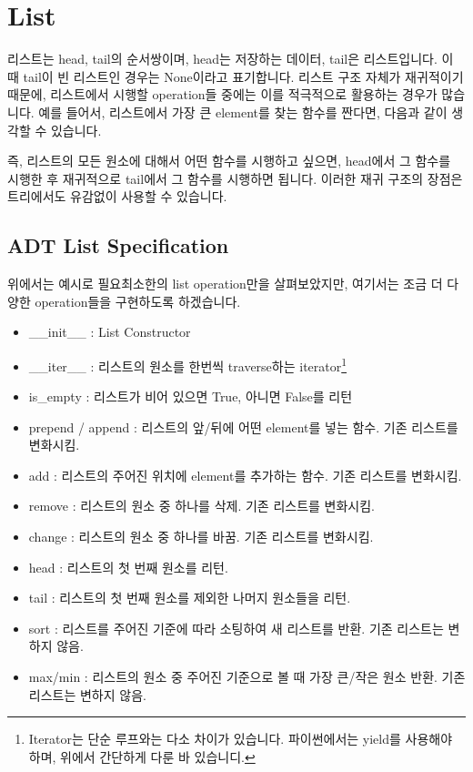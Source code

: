 \documentclass[titlepage]{report}
\begin{document}
\section{List} 

리스트는 head, tail의 순서쌍이며, head는 저장하는 데이터, tail은 리스트입니다. 이 때 tail이 빈 리스트인 경우는 None이라고 표기합니다. 리스트 구조 자체가 재귀적이기 때문에, 리스트에서 시행할 operation들 중에는 이를 적극적으로 활용하는 경우가 많습니다. 예를 들어서, 리스트에서 가장 큰 element를 찾는 함수를 짠다면, 다음과 같이 생각할 수 있습니다. 

 
                
즉, 리스트의 모든 원소에 대해서 어떤 함수를 시행하고 싶으면, head에서 그 함수를 시행한 후 재귀적으로 tail에서 그 함수를 시행하면 됩니다. 이러한 재귀 구조의 장점은 트리에서도 유감없이 사용할 수 있습니다. 

\subsection{ADT List Specification} 

위에서는 예시로 필요최소한의 list operation만을 살펴보았지만, 여기서는 조금 더 다양한 operation들을 구현하도록 하겠습니다. 

\begin{itemize} 
\item \_\_init\_\_ : List Constructor
\item \_\_iter\_\_ : 리스트의 원소를 한번씩 traverse하는 iterator\footnote{Iterator는 단순 루프와는 다소 차이가 있습니다. 파이썬에서는 yield를 사용해야 하며, 위에서 간단하게 다룬 바 있습니디.}
\item is\_empty : 리스트가 비어 있으면 True, 아니면 False를 리턴
\item prepend / append : 리스트의 앞/뒤에 어떤 element를 넣는 함수. 기존 리스트를 변화시킴. 
\item add : 리스트의 주어진 위치에 element를 추가하는 함수. 기존 리스트를 변화시킴. 
\item remove : 리스트의 원소 중 하나를 삭제. 기존 리스트를 변화시킴. 
\item change : 리스트의 원소 중 하나를 바꿈. 기존 리스트를 변화시킴. 
\item head : 리스트의 첫 번째 원소를 리턴. 
\item tail : 리스트의 첫 번째 원소를 제외한 나머지 원소들을 리턴. 
\item sort : 리스트를 주어진 기준에 따라 소팅하여 새 리스트를 반환. 기존 리스트는 변하지 않음. 
\item max/min : 리스트의 원소 중 주어진 기준으로 볼 때 가장 큰/작은 원소 반환. 기존 리스트는 변하지 않음. 
\end{itemize}
\end{document}
